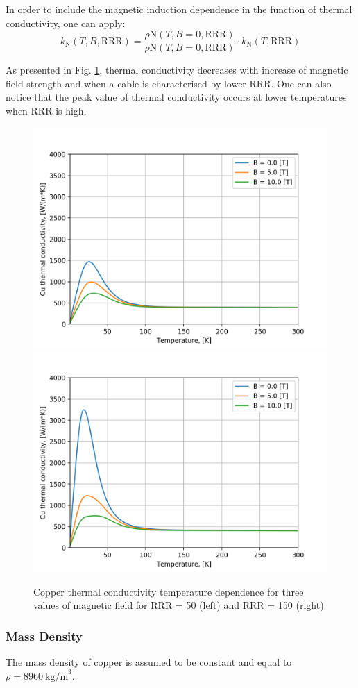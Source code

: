  In order to include the magnetic induction dependence in the function of thermal conductivity, one can apply: 
\begin{equation}
    k_\text{N}(T, B, \text{RRR}) = \frac{\rho\text{N}(T, B=0, \text{RRR})}{\rho\text{N}(T, B=0, \text{RRR})} \cdot k_\text{N}(T, \text{RRR})
\end{equation}

As presented in Fig. \ref{fig:cu_k_plot}, thermal conductivity decreases with increase of magnetic field strength and when a cable is characterised by lower RRR. One can also notice that the peak value of thermal conductivity occurs at lower temperatures when RRR is high. 
 
\begin{figure}[h!]
    \centering
    \includegraphics[width=0.49\linewidth]{figures/material_properties/Cu_k_B_Depenedence_plot_rrr_50.png}
    \includegraphics[width=0.49\linewidth]{figures/material_properties/Cu_k_B_Depenedence_plot_rrr_150.png}
    \caption{Copper thermal conductivity temperature dependence for three values of magnetic field for RRR = 50 (left) and RRR = 150 (right) }
    \label{fig:cu_k_plot}
\end{figure}

\subsubsection{Mass Density}
The mass density of copper is assumed to be constant and equal to $\rho = 8960~\text{kg/m}^{3}$.

